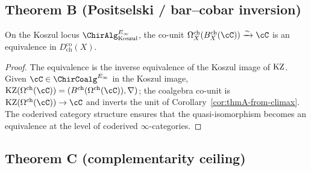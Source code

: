 \subsection{Theorem B (Positselski / bar--cobar inversion)}
\label{subsec:climax-thmB}

\begin{corollary}
\label{cor:thmB-from-climax}
\ClaimStatusProvedHere
On the Koszul locus \(\ChirAlgInf_{\mathrm{Koszul}}\), the co-unit
\(\Omega^{\mathrm{ch}}_{X}(B^{\mathrm{ch}}_{X}(\cC)) \xrightarrow{\sim} \cC\)
is an equivalence in \(D^{\mathrm{co}}_{\mathrm{ch}}(X)\).
\end{corollary}

\begin{proof}
The equivalence is the inverse equivalence of the Koszul image of
\(\mathrm{KZ}\). Given \(\cC \in \ChirCoalg^{E_{\infty}}\) in the Koszul image,
\(\KZ(\Omega^{\mathrm{ch}}(\cC)) = (B^{\mathrm{ch}}(\Omega^{\mathrm{ch}}(\cC)), \nabla)\);
the coalgebra co-unit is \(\KZ(\Omega^{\mathrm{ch}}(\cC)) \to \cC\) and
inverts the unit of Corollary~\ref{cor:thmA-from-climax}. The
coderived category structure ensures that the quasi-isomorphism becomes
an equivalence at the level of coderived \(\infty\)-categories.
\end{proof}

\subsection{Theorem C (complementarity ceiling)}
\label{subsec:climax-thmC}

